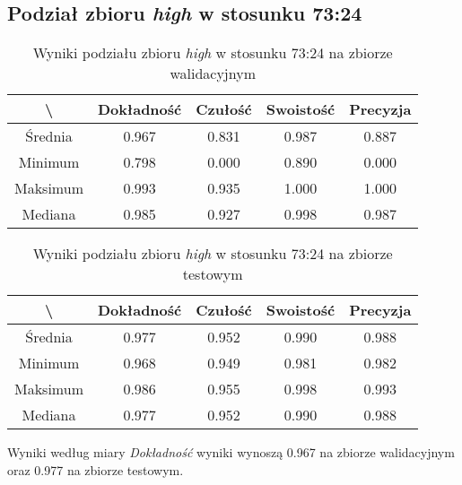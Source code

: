 \subsection{Podział zbioru \textit{high} w stosunku 73:24}


\begin{table}[H]
	\centering
	\caption{Wyniki podziału zbioru \textit{high} w stosunku 73:24 na zbiorze walidacyjnym}
	\vspace{6pt}
	{\footnotesize
		\begin{tabular}{|c|c|c|c|c|}
      \hline \textbackslash & Dokładność & Czułość & Swoistość & Precyzja \\
      \hline Średnia & 0.967 & 0.831 & 0.987 & 0.887 \\
      \hline Minimum & 0.798 & 0.000 & 0.890 & 0.000 \\
      \hline Maksimum & 0.993 & 0.935 & 1.000 & 1.000 \\
      \hline Mediana & 0.985 & 0.927 & 0.998 & 0.987 \\
      \hline
    \end{tabular}
    \label{Tab:highsplitc_val}
	}
	\vspace{0pt}
\end{table}

\begin{table}[H]
	\centering
	\caption{Wyniki podziału zbioru \textit{high} w stosunku 73:24 na zbiorze testowym}
	\vspace{6pt}
	{\footnotesize
		\begin{tabular}{|c|c|c|c|c|}
      \hline \textbackslash & Dokładność & Czułość & Swoistość & Precyzja \\
      \hline Średnia & 0.977 & 0.952 & 0.990 & 0.988 \\
      \hline Minimum & 0.968 & 0.949 & 0.981 & 0.982 \\
      \hline Maksimum & 0.986 & 0.955 & 0.998 & 0.993 \\
      \hline Mediana & 0.977 & 0.952 & 0.990 & 0.988 \\
      \hline
    \end{tabular}
    \label{Tab:highsplitc_test}
	}
	\vspace{0pt}
\end{table}

Wyniki według miary \textit{Dokładność} wyniki wynoszą 0.967 na zbiorze walidacyjnym oraz 0.977 na zbiorze testowym.
